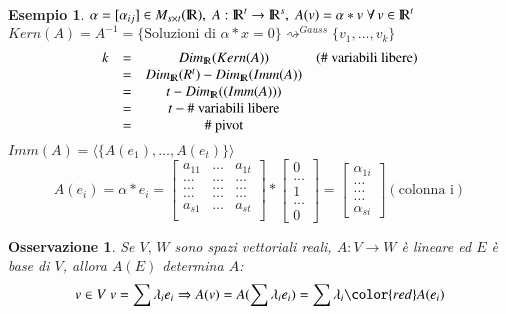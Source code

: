 \documentclass[12pt,a4paper]{article}
\theoremstyle{break}
\newtheorem{example}{Esempio}[subsection]
\newtheorem{observation}{Osservazione}[subsection]
\newcommand\R{{\rm I\!R}}
\newcommand{\Dim}[1]{Dim_{\R}(#1)}
\newcommand{\func}[3]{#1:#2\rightarrow #3}
\begin{document}
    \newpage
    \begin{example}
        $\alpha = [\alpha_{ij}]\in M_{s\times t}(\R),\; \func{A}{\R^t}{\R^s},\; A(v) = \alpha * v\; \forall\, v\in \R^t$\newline
        $Kern(A) = A^{-1} = \{\text{Soluzioni di } \alpha * x = 0\} \rightsquigarrow^{Gauss} \{v_1,\dots , v_k\}$
        \[
            \begin{matrix}
                k & = & \Dim{Kern(A)} & (\#\text{ variabili libere}) \\
                & = & \Dim{R^t} - \Dim{Imm(A)} \\
                & = & t - \Dim{(Imm(A))} \\
                & = & t - \#\text{ variabili libere} \\
                & = & \# \text{ pivot}
            \end{matrix}
        \]
        $Imm(A) = \langle\{ A(e_1),\dots , A(e_t)\}\rangle$ 
        \[
            A(e_i) = \alpha * e_i = 
            \begin{bmatrix}
                a_{11} & \dots & a_{1t} \\
                \dots & \dots & \dots \\
                \dots & \dots & \dots \\
                \dots & \dots & \dots \\
                a_{s1} & \dots & a_{st} \\
            \end{bmatrix}
            *
            \begin{bmatrix}
                0 \\ \dots \\ 1 \\ \dots \\ 0
            \end{bmatrix}
            =
            \begin{bmatrix}
                \alpha_{1i} \\ \dots \\ \dots \\ \dots \\ \alpha_{si}
            \end{bmatrix}
            (\text{colonna i})
        \]
    \end{example}
    \begin{observation}
        Se $V,\, W$ sono spazi vettoriali reali, $\func{A}{V}{W}$ è lineare ed $E$ è base di $V$, allora $A(E)$ determina $A$:
        \[v\in V\; v = \sum \lambda_ie_i\Rightarrow A(v) = A(\sum\lambda_ie_i) = \sum \lambda_i\color{red}A(e_i)\]
    \end{observation}
\end{document}
